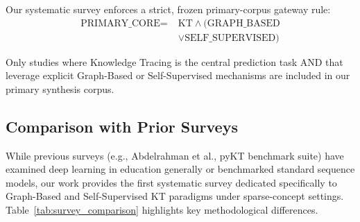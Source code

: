 \documentclass[10pt,journal,compsoc]{IEEEtran}
\begin{document}
Our systematic survey enforces a strict, frozen primary-corpus gateway rule:
\begin{equation}
\begin{split}
\text{PRIMARY\_CORE} = \; & \text{KT} \land (\text{GRAPH\_BASED} \\
& \lor \text{SELF\_SUPERVISED})
\end{split}
\end{equation}

Only studies where Knowledge Tracing is the central prediction task AND that leverage explicit Graph-Based or Self-Supervised mechanisms are included in our primary synthesis corpus.

\subsection{Comparison with Prior Surveys}
While previous surveys (e.g., Abdelrahman et al., pyKT benchmark suite) have examined deep learning in education generally or benchmarked standard sequence models, our work provides the first systematic survey dedicated specifically to Graph-Based and Self-Supervised KT paradigms under sparse-concept settings. Table~\ref{tab:survey_comparison} highlights key methodological differences.

\begin{table}[t]
\caption{Comparison with Prior Knowledge Tracing Surveys}
\label{tab:survey_comparison}
\centering
{}
\end{table}
\end{document}
